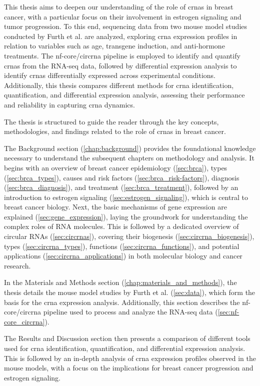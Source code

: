 This thesis aims to deepen our understanding of the role of \gls{crna}s in
breast cancer, with a particular focus on their involvement in estrogen
signaling and tumor progression.
To this end, sequencing data from two mouse model studies conducted by Furth et
al.
\supercite{furth_esr1_2023,furth_overexpression_2023}
are analyzed, exploring \gls{crna} expression profiles in relation to variables
such as age, transgene induction, and anti-hormone treatments.
The nf-core/circrna pipeline\supercite{digby_nf-corecircrna_2023} is employed
to identify and quantify \gls{crna}s from the RNA-seq data, followed by
differential expression analysis to identify \gls{crna}s differentially
expressed across experimental conditions.
Additionally, this thesis compares different methods for \gls{crna}
identification, quantification, and differential expression analysis, assessing
their performance and reliability in capturing \gls{crna} dynamics.

\medskip
\noindent The thesis is structured to guide the reader through the key
concepts,
methodologies, and findings related to the role of \gls{crna}s in breast
cancer.

The Background section (\cref{chap:background}) provides the foundational
knowledge necessary to understand the subsequent chapters on methodology and
analysis.
It begins with an overview of breast cancer epidemiology (\cref{sec:brca}),
types (\cref{sec:brca_types}), causes and risk factors
(\cref{sec:brca_risk-factors}), diagnosis (\cref{sec:brca_diagnosis}), and
treatment (\cref{sec:brca_treatment}), followed by an introduction to estrogen
signaling (\cref{sec:estrogen_signaling}), which is central to breast cancer
biology.
Next, the basic mechanisms of gene expression are explained
(\cref{sec:gene_expression}), laying the groundwork for understanding the
complex roles of RNA molecules.
This is followed by a dedicated overview of circular RNAs
(\cref{sec:circrnas}), covering their biogenesis
(\cref{sec:circrna_biogenesis}), types (\cref{sec:circrna_types}), functions
(\cref{sec:circrna_functions}), and potential applications
(\cref{sec:circrna_applications}) in both molecular biology and cancer
research.

In the Materials and Methods section (\cref{chap:materials_and_methods}), the
thesis details the mouse model studies by Furth et al.
\supercite{furth_esr1_2023,furth_overexpression_2023} (\cref{sec:data}),
which form the basis for the \gls{crna} expression
analysis.
Additionally, this section describes the nf-core/circrna
pipeline\supercite{digby_nf-corecircrna_2023} used to process and analyze the
RNA-seq data (\cref{sec:nf-core_circrna}).

The Results and Discussion section then presents a comparison of different
tools used for \gls{crna} identification, quantification, and differential
expression analysis.
This is followed by an in-depth analysis of \gls{crna} expression profiles
observed in the mouse models, with a focus on the implications for breast
cancer progression and estrogen signaling.
